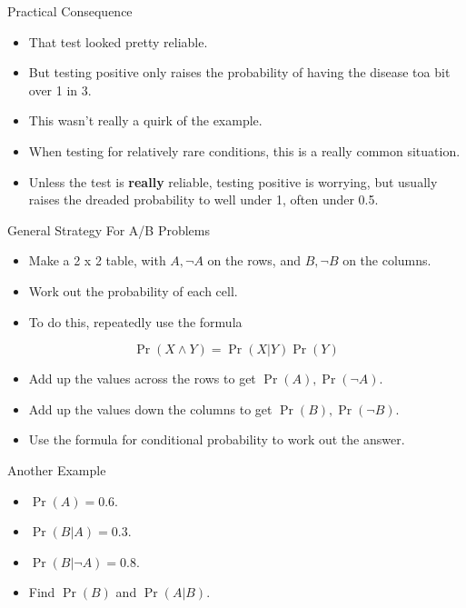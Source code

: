 \documentclass[
  ignorenonframetext,
]{beamer}
\providecommand{\tightlist}{%
  \setlength{\itemsep}{0pt}\setlength{\parskip}{0pt}}
\renewcommand{\,}{\text{, }}
\begin{document}
\begin{frame}{Practical Consequence}
\protect\hypertarget{practical-consequence}{}
\begin{itemize}
\tightlist
\item
  That test looked pretty reliable.
\item
  But testing positive only raises the probability of having the disease
  toa bit over 1 in 3.
\item
  This wasn't really a quirk of the example.
\item
  When testing for relatively rare conditions, this is a really common
  situation.
\item
  Unless the test is \textbf{really} reliable, testing positive is
  worrying, but usually raises the dreaded probability to well under 1,
  often under 0.5.
\end{itemize}
\end{frame}

\begin{frame}{General Strategy For A/B Problems}
\protect\hypertarget{general-strategy-for-ab-problems}{}
\begin{itemize}
\tightlist
\item
  Make a 2 x 2 table, with \(A, \neg A\) on the rows, and \(B, \neg B\)
  on the columns.
\item
  Work out the probability of each cell.
\item
  To do this, repeatedly use the formula
\end{itemize}

\[
\Pr(X \wedge Y) = \Pr(X | Y)\Pr(Y)
\]

\begin{itemize}
\tightlist
\item
  Add up the values across the rows to get \(\Pr(A), \Pr(\neg A)\).
\item
  Add up the values down the columns to get \(\Pr(B), \Pr(\neg B)\).
\item
  Use the formula for conditional probability to work out the answer.
\end{itemize}
\end{frame}

\begin{frame}{Another Example}
\protect\hypertarget{another-example}{}
\begin{itemize}
\tightlist
\item
  \(\Pr(A) = 0.6\).
\item
  \(\Pr(B | A) = 0.3\).
\item
  \(\Pr(B | \neg A) = 0.8\).
\item
  Find \(\Pr(B)\) and \(\Pr(A | B)\).
\end{itemize}
\end{frame}
\end{document}
